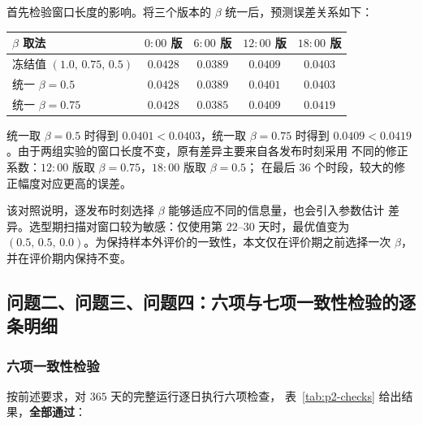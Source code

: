 首先检验窗口长度的影响。将三个版本的 $\beta$ 统一后，预测误差关系如下：
\begin{center}
\small
\begin{tabular}{lcccc}
  \toprule
  $\beta$ 取法 & $0{:}00$ 版 & $6{:}00$ 版 & $12{:}00$ 版 & $18{:}00$ 版 \\
  \midrule
  冻结值 $(1.0,\,0.75,\,0.5)$ & $0.0428$ & $0.0389$ & $0.0409$ & $0.0403$ \\
  统一 $\beta=0.5$             & $0.0428$ & $0.0389$ & $0.0401$ & $0.0403$ \\
  统一 $\beta=0.75$            & $0.0428$ & $0.0385$ & $0.0409$ & $0.0419$ \\
  \bottomrule
\end{tabular}
\end{center}
统一取 $\beta=0.5$ 时得到 $0.0401<0.0403$，统一取 $\beta=0.75$ 时得到
$0.0409<0.0419$。由于两组实验的窗口长度不变，原有差异主要来自各发布时刻采用
不同的修正系数：$12{:}00$ 版取 $\beta=0.75$，$18{:}00$ 版取 $\beta=0.5$；
在最后 $36$ 个时段，较大的修正幅度对应更高的误差。

该对照说明，逐发布时刻选择 $\beta$ 能够适应不同的信息量，也会引入参数估计
差异。选型期扫描对窗口较为敏感：仅使用第 $22$--$30$ 天时，最优值变为
$(0.5,\,0.5,\,0.0)$。为保持样本外评价的一致性，本文仅在评价期之前选择一次
$\beta$，并在评价期内保持不变。

\subsection{问题二、问题三、问题四：六项与七项一致性检验的逐条明细}
\label{app:checks}

\subsubsection{六项一致性检验}

按前述要求，对 $365$ 天的完整运行逐日执行六项检查，
表~\ref{tab:p2-checks} 给出结果，\textbf{全部通过}：

